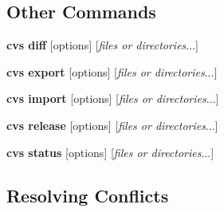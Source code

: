 \subsection{Other Commands}


\begin{description}


\item{{\bf cvs diff} [options] [{\em files or directories}...]}



\item{{\bf cvs export} [options] [{\em files or directories}...]}

\item{{\bf cvs import} [options] [{\em files or directories}...]}

\item{{\bf cvs release} [options] [{\em files or directories}...]}

\item{{\bf cvs status} [options] [{\em files or directories}...]}


\end{description}



\subsection{Resolving Conflicts}\label{resolving_conflicts}
